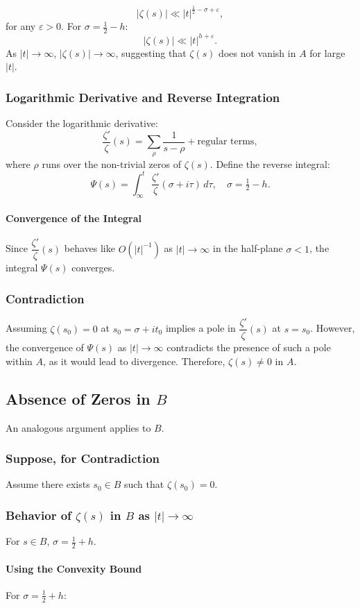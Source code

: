 \documentclass{article}
\begin{document}
\[|\zeta(s)| \ll |t|^{\frac{1}{2} - \sigma + \varepsilon},
\] for any $\varepsilon > 0$. For $\sigma = \tfrac{1}{2} - h$: \[
|\zeta(s)| \ll |t|^{h + \varepsilon}.
\] As $|t| \to \infty$, $|\zeta(s)| \to \infty$, suggesting that $\zeta(s)$ does not vanish in $A$ for large $|t|$. \subsubsection{Logarithmic Derivative and Reverse Integration} Consider the logarithmic derivative: \[
\dfrac{\zeta'}{\zeta}(s) = \sum_{\rho} \dfrac{1}{s - \rho} + \text{regular terms},
\] where $\rho$ runs over the non-trivial zeros of $\zeta(s)$. Define the reverse integral: \[
\Psi(s) = \int_{\infty}^{t} \dfrac{\zeta'}{\zeta}(\sigma + i\tau) \, d\tau, \quad \sigma = \tfrac{1}{2} - h.
\] \paragraph{Convergence of the Integral} Since $\dfrac{\zeta'}{\zeta}(s)$ behaves like $O(|t|^{-1})$ as $|t| \to \infty$ in the half-plane $\sigma < 1$, the integral $\Psi(s)$ converges. \subsubsection{Contradiction} Assuming $\zeta(s_0) = 0$ at $s_0 = \sigma + i t_0$ implies a pole in $\dfrac{\zeta'}{\zeta}(s)$ at $s = s_0$. However, the convergence of $\Psi(s)$ as $|t| \to \infty$ contradicts the presence of such a pole within $A$, as it would lead to divergence. Therefore, $\zeta(s) \neq 0$ in $A$. \subsection{Absence of Zeros in $B$} An analogous argument applies to $B$. \subsubsection{Suppose, for Contradiction} Assume there exists $s_0 \in B$ such that $\zeta(s_0) = 0$. \subsubsection{Behavior of $\zeta(s)$ in $B$ as $|t| \to \infty$} For $s \in B$, $\sigma = \tfrac{1}{2} + h$. \paragraph{Using the Convexity Bound} For $\sigma = \tfrac{1}{2} + h$: \[
\]
\end{document}
